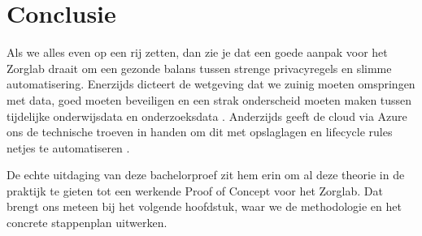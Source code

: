 \section{Conclusie}%
\label{subsec:lit_conclusie}

Als we alles even op een rij zetten, dan zie je dat een goede aanpak voor het Zorglab draait om een gezonde balans tussen strenge privacyregels en slimme automatisering. Enerzijds dicteert de wetgeving dat we zuinig moeten omspringen met data, goed moeten beveiligen en een strak onderscheid moeten maken tussen tijdelijke onderwijsdata en onderzoeksdata \parencite{CHSU2023, GDPR2016, Sensors2025}. Anderzijds geeft de cloud via Azure ons de technische troeven in handen om dit met opslaglagen en lifecycle rules netjes te automatiseren \parencite{AzureWellArchitected2026, AzureLifecycle2026}.

De echte uitdaging van deze bachelorproef zit hem erin om al deze theorie in de praktijk te gieten tot een werkende Proof of Concept voor het Zorglab. Dat brengt ons meteen bij het volgende hoofdstuk, waar we de methodologie en het concrete stappenplan uitwerken.